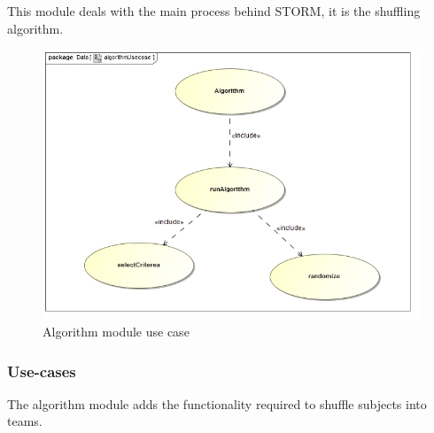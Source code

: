 This module deals with the main process behind STORM, it is the shuffling algorithm.
\begin{figure}[H]
	\centering
	\includegraphics[width=15cm]{./graphics/algorithmUsecase.jpg}
	\caption{Algorithm module use case}
\end{figure}
\subsubsection{Use-cases}

The algorithm module adds the functionality required to shuffle subjects into teams.\par

